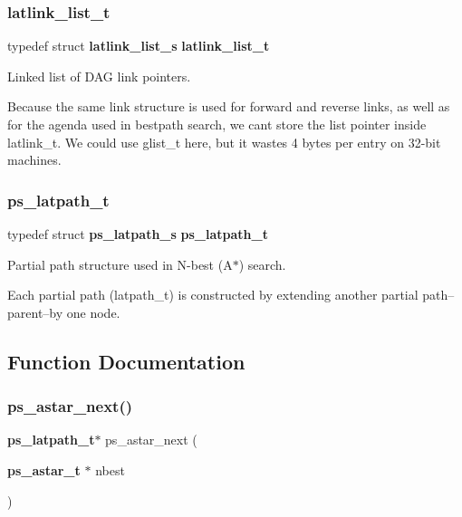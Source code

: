 \subsubsection{latlink\+\_\+list\+\_\+t}
{\footnotesize\ttfamily typedef struct \textbf{ latlink\+\_\+list\+\_\+s}  \textbf{ latlink\+\_\+list\+\_\+t}}



Linked list of D\+AG link pointers. 

Because the same link structure is used for forward and reverse links, as well as for the agenda used in bestpath search, we can\textquotesingle{}t store the list pointer inside latlink\+\_\+t. We could use glist\+\_\+t here, but it wastes 4 bytes per entry on 32-\/bit machines. \mbox{\label{ps__lattice__internal_8h_aba5a485290f665fb2e7e514a32ba3073}} 
\subsubsection{ps\+\_\+latpath\+\_\+t}
{\footnotesize\ttfamily typedef struct \textbf{ ps\+\_\+latpath\+\_\+s}  \textbf{ ps\+\_\+latpath\+\_\+t}}



Partial path structure used in N-\/best (A$\ast$) search. 

Each partial path (latpath\+\_\+t) is constructed by extending another partial path--parent--by one node. 

\subsection{Function Documentation}
\mbox{\label{ps__lattice__internal_8h_a6bea95f8fb827af790bbe6ce1920908c}} 
\subsubsection{ps\+\_\+astar\+\_\+next()}
{\footnotesize\ttfamily \textbf{ ps\+\_\+latpath\+\_\+t}$\ast$ ps\+\_\+astar\+\_\+next (\begin{DoxyParamCaption}\item[{\textbf{ ps\+\_\+astar\+\_\+t} $\ast$}]{nbest }\end{DoxyParamCaption})}



